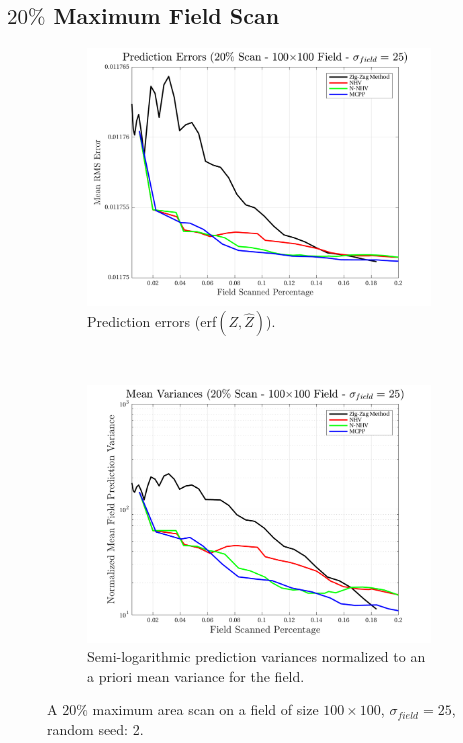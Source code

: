 \FloatBarrier
\clearpage
\subsection{$20\%$ Maximum Field Scan}
\begin{figure}[htb!]
    \centering
    \begin{subfigure}[t]{0.65\textwidth}
        \centering
        \includegraphics[width=\linewidth]{figures/hbresults/pred_errs_20p_100x100_sf_25_seed_2.png}
        \captionsetup{skip=0.20\baselineskip,size=footnotesize}
        \caption{Prediction errors (erf$(Z,\hat{Z})$).}
        \label{fig:prederrs_sigma25_p20_s2}
    \end{subfigure}%
    \\
    \begin{subfigure}[t]{0.65\textwidth}
        \centering
        \includegraphics[width=\linewidth]{figures/hbresults/vars_20p_100x100_sf_25_seed_2.png}
        \captionsetup{skip=0.20\baselineskip,size=footnotesize}
        \caption{Semi-logarithmic prediction variances normalized to an a priori mean variance for the field.}
        \label{fig:prederrs_sigma25_p20_s2}
    \end{subfigure}
    \captionsetup{skip=0.20\baselineskip}
    \caption{A $20\%$ maximum area scan on a field of size $100 \times 100$, $\sigma_{field} = 25$, random seed: 2.}
    \label{fig:sigma25_p20_s2}
\end{figure}

